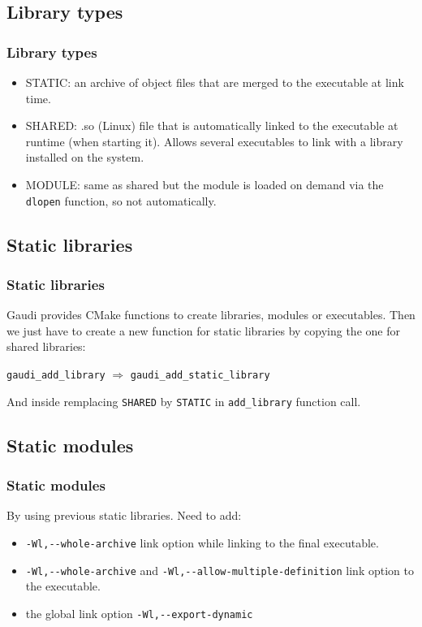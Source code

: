 \documentclass{beamer}
\begin{document}
    \subsection{Library types}

    \begin{frame}[fragile]
        \frametitle{Library types}

        \begin{itemize}
            \item STATIC: an archive of object files that are merged to the executable at link time.
            \item SHARED: .so (Linux) file that is automatically linked to the executable at runtime (when starting it).
            Allows several executables to link with a library installed on the system.
            \item MODULE: same as shared but the module is loaded on demand via the \verb'dlopen' function, so not automatically.
        \end{itemize}
    \end{frame}

    \subsection{Static libraries}

    \begin{frame}[fragile]
        \frametitle{Static libraries}

        Gaudi provides CMake functions to create libraries, modules or executables.
        Then we just have to create a new function for static libraries by copying the one for shared libraries:

        \verb'gaudi_add_library' $\Rightarrow$ \verb'gaudi_add_static_library'

        And inside remplacing \verb'SHARED' by \verb'STATIC' in \verb'add_library' function call.
    \end{frame}

    \subsection{Static modules}

    \begin{frame}[fragile]
        \frametitle{Static modules}

        By using previous static libraries.
        Need to add:
        \begin{itemize}
            \item \verb'-Wl,--whole-archive' link option while linking to the final executable.
            \item \verb'-Wl,--whole-archive' and \verb'-Wl,--allow-multiple-definition' link option to the executable.
            \item the global link option \verb'-Wl,--export-dynamic'
        \end{itemize}
    \end{frame}
\end{document}
